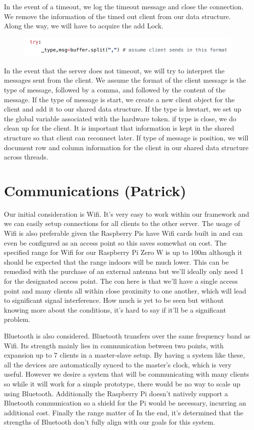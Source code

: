 \documentclass[a4paper,10pt]{article}
\begin{document}
In the event of a timeout, we log the timeout message and close the connection. We remove the information of the timed out client from our data structure. Along the way, we will have to acquire the add Lock. 
\pagebreak
\begin{figure}[H]
  \centering
      \includegraphics[width=\textwidth]{Assets/try.png}
\end{figure}

In the event that the server does not timeout, we will try to interpret the messages sent from the client. We assume the format of the client message is the type of message, followed by a comma, and followed by the content of the message. If the type of message is start, we create a new client object for the client and add it to our shared data structure. If the type is hwstart, we set up the global variable associated with the hardware token. if type is close, we do clean up for the client. It is important that information is kept in the shared structure so that client can reconnect later. If type of message is position, we will document row and column information for the client in our shared data structure across threads.
\section{Communications (Patrick)}

Our initial consideration is Wifi. It's very easy to work within our framework and we can easily setup connections for all clients to the other server. The usage of Wifi is also preferable given the Raspberry Pis have Wifi cards built in and can even be configured as an access point so this saves somewhat on cost. The specified range for Wifi for our Raspberry Pi Zero W is up to 100m although it should be expected that the range indoors will be much lower. This can be remedied with the purchase of an external antenna but we'll ideally only need 1 for the designated access point. The con here is that we'll have a single access point and many clients all within close proximity to one another, which will lead to significant signal interference. How much is yet to be seen but without knowing more about the conditions, it's hard to say if it'll be a significant problem.

    Bluetooth is also considered. Bluetooth transfers over the same frequency band as Wifi. Its strength mainly lies in communication between two points, with expansion up to 7 clients in a master-slave setup. By having a system like these, all the devices are automatically synced to the master's clock, which is very useful. However we desire a system that will be communicating with many clients so while it will work for a simple prototype, there would be no way to scale up using Bluetooth. Additionally the Raspberry Pi doesn't natively support a Bluetooth communication so a shield for the Pi would be necessary, incurring an additional cost. Finally the range matter of  In the end, it's determined that the strengths of Bluetooth don't fully align with our goals for this system.
\end{document}

